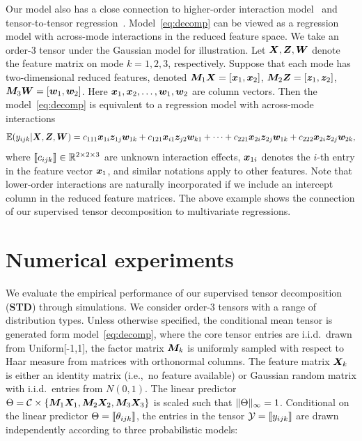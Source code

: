 \documentclass[12pt]{article}
\theoremstyle{definition}
\theoremstyle{definition}
\begin{document}
Our model also has a close connection to higher-order interaction model~\citep{hao2020sparse} and tensor-to-tensor regression~\citep{lock2018tensor}. Model~\eqref{eq:decomp} can be viewed as a regression model with across-mode interactions in the reduced feature space. We take an order-3 tensor under the Gaussian model for illustration. Let $\bm X,\bm Z,\bm{W}$ denote the feature matrix on mode $k=1, 2, 3$, respectively. Suppose that each mode has two-dimensional reduced features, denoted $\bm M_1\bm X=[\bm x_1,\bm x_2]$, $\bm M_2\bm Z=[\bm{z}_1,\bm{z}_2]$, $\bm M_3\bm{W}=[\bm{w}_1,\bm{w}_2]$. Here $\bm x_1,\bm x_2,\ldots,\bm{w}_1, \bm{w}_2$ are column vectors. Then the model~\eqref{eq:decomp} is equivalent to a regression model with across-mode interactions
\begin{equation}
\mathbb{E}(y_{ijk}|\bm X,\bm Z,\bm{W})=c_{111}\bm x_{1i}\bm{z}_{1j}\bm{w}_{1k}+c_{121}\bm x_{i1}\bm{z}_{j2}\bm{w}_{k1}+\cdots+c_{221}\bm x_{2i}\bm{z}_{2j}\bm{w}_{1k}+c_{222}\bm x_{2i}\bm{z}_{2j}\bm{w}_{2k},
\end{equation}
where $\llbracket c_{ijk} \rrbracket \in \mathbb{R}^{2\times 2\times 3}$ are unknown interaction effects, $\bm x_{1i}$ denotes the $i$-th entry in the feature vector $\bm x_1$, and similar notations apply to other features. Note that lower-order interactions are naturally incorporated if we include an intercept column in the reduced feature matrices. The above example shows the connection of our supervised tensor decomposition to multivariate regressions. 


\section{Numerical experiments}\label{sec:simulation}
We evaluate the empirical performance of our supervised tensor decomposition (\textbf{STD}) through simulations. We consider order-3 tensors with a range of distribution types. Unless otherwise specified, the conditional mean tensor is generated form model~\eqref{eq:decomp}, where the core tensor entries are i.i.d.\ drawn from Uniform[-1,1], the factor matrix $\bm M_k$ is uniformly sampled with respect to Haar measure from matrices with orthonormal columns. The feature matrix $\bm X_k$ is either an identity matrix (i.e.,\ no feature  available) or Gaussian random matrix with i.i.d.\ entries from $N(0,1)$. The linear predictor $\Theta=\mathcal{C}\times\{\bm M_1\bm X_1,\bm M_2\bm X_2,\bm M_3\bm X_3\}$ is scaled such that $\lVert\Theta\rVert_\infty=1$. Conditional on the linear predictor $\Theta=\llbracket \theta_{ijk} \rrbracket$, the entries in the tensor $\mathcal{Y}=\llbracket y_{ijk} \rrbracket$ are drawn independently according to three probabilistic models:
\end{document}
